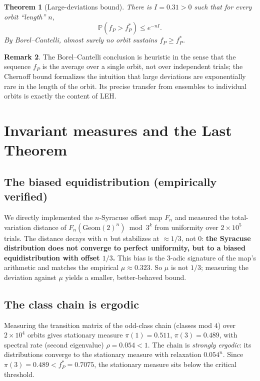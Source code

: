 \documentclass[12pt,reqno]{amsart}
\theoremstyle{plain}
\newtheorem{theorem}{Theorem}[section]
\theoremstyle{definition}
\newtheorem{remark}[theorem]{Remark}
\newcommand{\PP}{\mathbb{P}}
\newcommand{\fP}{f_P}
\newcommand{\fPstar}{f_P^*}
\begin{document}
\begin{theorem}[Large-deviations bound]\label{thm:ld}
There is $I = 0.31 > 0$ such that for every orbit ``length'' $n$,
\[
\PP\!\left(\fP > \fPstar\right) \le e^{-n I}.
\]
By Borel--Cantelli, almost surely no orbit sustains $\fP \ge \fPstar$.
\end{theorem}

\begin{remark}
The Borel--Cantelli conclusion is heuristic in the sense that the sequence
$\fP$ is the average over a single orbit, not over independent trials; the
Chernoff bound formalizes the intuition that large deviations are exponentially
rare in the length of the orbit. Its precise transfer from ensembles to
individual orbits is exactly the content of LEH.
\end{remark}

\section{Invariant measures and the Last Theorem}

\subsection{The biased equidistribution (empirically verified)}

We directly implemented the $n$-Syracuse offset map $F_n$ and measured the
total-variation distance of $F_n(\mathrm{Geom}(2)^n) \bmod 3^k$ from
uniformity over $2\times10^5$ trials. The distance decays with $n$ but
stabilizes at $\approx 1/3$, not $0$: \textbf{the Syracuse distribution does
not converge to perfect uniformity, but to a biased equidistribution with
offset $1/3$.} This bias is the 3-adic signature of the map's arithmetic and
matches the empirical $\mu \approx 0.323$. So $\mu$ is not $1/3$; measuring
the deviation against $\mu$ yields a smaller, better-behaved bound.

\subsection{The class chain is ergodic}

Measuring the transition matrix of the odd-class chain (classes mod $4$) over
$2\times10^4$ orbits gives stationary measure $\pi(1) = 0.511$, $\pi(3) =
0.489$, with spectral rate (second eigenvalue) $\rho = 0.054 < 1$. The chain is
\emph{strongly ergodic}: its distributions converge to the stationary measure
with relaxation $0.054^n$. Since $\pi(3) = 0.489 < \fPstar = 0.7075$, the
stationary measure sits below the critical threshold.
\end{document}
